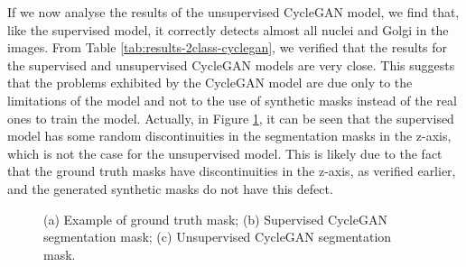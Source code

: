 If we now analyse the results of the unsupervised CycleGAN model, we find that, like the supervised model, it correctly detects almost all nuclei and Golgi in the images. From Table \ref{tab:results-2class-cyclegan}, we verified that the results for the supervised and unsupervised CycleGAN models are very close. This suggests that the problems exhibited by the CycleGAN model are due only to the limitations of the model and not to the use of synthetic masks instead of the real ones to train the model. Actually, in Figure \ref{fig:lowresolution-cycleGAN}, it can be seen that the supervised model has some random discontinuities in the segmentation masks in the z-axis, which is not the case for the unsupervised model. This is likely due to the fact that the ground truth masks have discontinuities in the z-axis, as verified earlier, and the generated synthetic masks do not have this defect.

\begin{figure}[!htb]
  \centering
  \hfil
  \hfil 
 
  \caption{(a) Example of ground truth mask; (b) Supervised CycleGAN segmentation mask; (c) Unsupervised CycleGAN segmentation mask.}
  
  \label{fig:lowresolution-cycleGAN}
  
  \end{figure}


